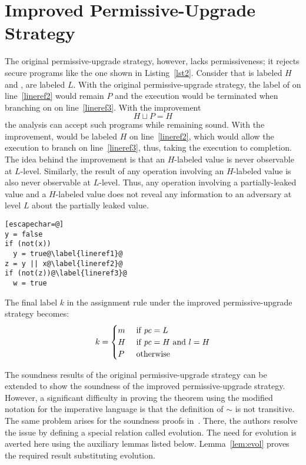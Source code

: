 \section{Improved Permissive-Upgrade Strategy}
\label{sec:ipus}

The original permissive-upgrade strategy, however, lacks 
permissiveness; it rejects secure programs like the one shown in
Listing~\ref{lst2}. Consider that  is labeled $H$
and ,  are labeled $L$. With the original permissive-upgrade
strategy, the label of  on
line~\ref{lineref2} would remain $P$ and the execution would be
terminated when branching on  on line~\ref{lineref3}. With the 
improvement $$H \sqcup P = H$$ the analysis can accept such programs
while remaining sound. With the improvement,  would be labeled
$H$ on line~\ref{lineref2}, which would allow the execution to branch
on line~\ref{lineref3}, thus, 
taking the execution to completion. 
The idea behind the improvement is that an $H$-labeled value is
never observable at $L$-level. Similarly, the result of any operation
involving an $H$-labeled value is also never observable at
$L$-level. Thus, any operation involving a partially-leaked value and
a $H$-labeled value does not reveal any information to an adversary at
level $L$ about the partially leaked value. 

\begin{lstlisting}[float,label=lst2,caption=Example showing the
  impermissiveness of the original permissive-upgrade strategy][escapechar=@]
y = false
if (not(x))
  y = true@\label{lineref1}@
z = y || x@\label{lineref2}@
if (not(z))@\label{lineref3}@
  w = true
\end{lstlisting}

The final label $k$ in the assignment rule  under
the improved permissive-upgrade strategy becomes: 
$$ k = %
\begin{cases}
m & \mbox{ if } \pc = L \\
H  & \mbox{ if } \pc = H \mbox{ and } l = H\\
P  & \mbox{ otherwise}
\end{cases} %
$$

The soundness results of the original permissive-upgrade strategy can
be extended to show the soundness of the improved permissive-upgrade
strategy. However, a significant difficulty in proving the theorem
using the modified notation for the imperative language is that the
definition of $\sim$ is not transitive. The same problem arises for
the soundness proofs in~\cite{plas10}. There, the authors resolve the
issue by defining a special relation called evolution. The need for
evolution is averted here using the auxiliary lemmas listed
below. Lemma~\ref{lem:evol} proves the required result substituting
evolution.  

